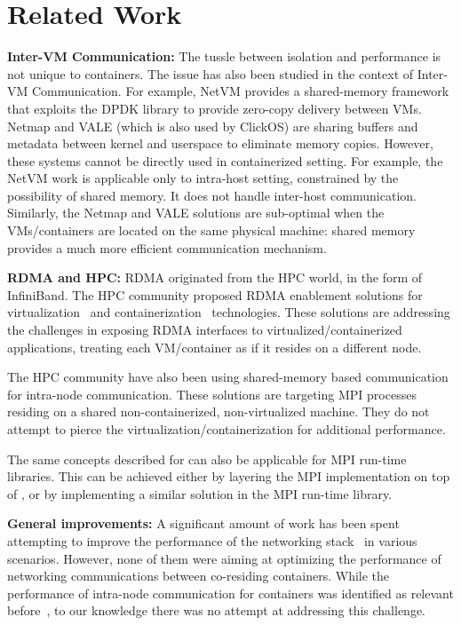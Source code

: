 \section{Related Work} \label{sec:related}


\textbf{Inter-VM Communication:} The tussle between isolation and performance is
not unique to containers.  The issue has also been studied in the context of
Inter-VM Communication.  For example, NetVM\cite{netvm} provides a shared-memory
framework that exploits the DPDK library to provide zero-copy delivery between
VMs.  Netmap\cite{netmap} and VALE\cite{vale} (which is also used by
ClickOS\cite{clickos}) are sharing buffers and metadata between kernel and
userspace to eliminate memory copies.  However, these systems cannot be directly
used in containerized setting.  For example, the NetVM work is applicable only
to intra-host setting, constrained by the possibility of shared memory. It does
not handle inter-host communication.  Similarly, the Netmap and VALE solutions
are sub-optimal when the VMs/containers are located on the same physical
machine: shared memory provides a much more efficient communication mechanism.

\textbf{RDMA and HPC:} RDMA originated from the HPC world, in the form of
InfiniBand. The HPC community proposed RDMA enablement solutions for
virtualization~\cite{ranadive2012toward} and
containerization~\cite{rdmacontainers} technologies. These solutions are
addressing the challenges in exposing RDMA interfaces to
virtualized/containerized applications, treating each VM/container as if it
resides on a different node.

The HPC community have also been using shared-memory based
communication~\cite{KNEM,MPI:p:MPI,HybridMPI} for intra-node communication.
These solutions are targeting MPI processes residing on a shared
non-containerized, non-virtualized machine. They do not attempt to pierce the
virtualization/containerization for additional performance.

The same concepts described for \sysname can also be applicable for MPI run-time
libraries. This can be achieved either by layering the MPI implementation on top
of \sysname, or by implementing a similar solution in the MPI run-time library.

\textbf{General improvements:} A significant amount of work has been spent
attempting to improve the performance of the networking
stack~\cite{lls,rfc7609,XenLoop} in various scenarios. However, none of them
were aiming at optimizing the performance of networking communications between
co-residing containers. While the performance of intra-node communication for
containers was identified as relevant
before~\cite{container-networking-modules}, to our knowledge there was no
attempt at addressing this challenge.


